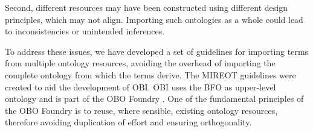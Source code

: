 \documentclass[a4paper,10pt,twocolumn]{article}
\begin{document}


Second, different resources may have been constructed using different design principles, which may not align.
Importing such ontologies as a whole could lead to inconsistencies or unintended inferences.




To address these issues, we have developed a set of guidelines for importing terms from multiple ontology resources, avoiding the overhead of importing the complete ontology from which the terms derive. 
The \ac{MIREOT} guidelines were created to aid the development of \ac{OBI}\cite{RefWorks:1507}.
\ac{OBI} uses the \ac{BFO} \cite{RefWorks:1557} as upper-level ontology and is part of the \ac{OBO} Foundry \cite{RefWorks:1472}. 
One of the fundamental principles of the \ac{OBO} Foundry is to reuse, where sensible, existing ontology resources, therefore avoiding duplication of effort and ensuring orthogonality.

\end{document}
